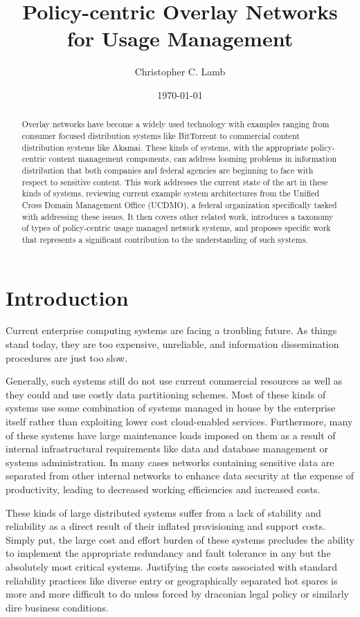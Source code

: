 \documentclass[12pt,letterpaper]{article}
\author{Christopher C. Lamb}
\title{Policy-centric Overlay Networks for Usage Management}
\date{\today}
\begin{document}
\maketitle

\doublespacing

\begin{abstract}
Overlay networks have become a widely used technology with examples ranging from consumer focused distribution systems like BitTorrent to commercial content distribution systems like Akamai.  These kinds of systems, with the appropriate policy-centric content management components, can address looming problems in information distribution that both companies and federal agencies are beginning to face with respect to sensitive content.  This work addresses the current state of the art in these kinds of systems, reviewing current example system architectures from the Unified Cross Domain Management Office (UCDMO), a federal organization specifically tasked with addressing these issues.  It then covers other related work, introduces a taxonomy of types of policy-centric usage managed network systems, and proposes specific work that represents a significant contribution to the understanding of such systems. 
\end{abstract}

\section{Introduction}
Current enterprise computing systems are facing a troubling future.  As things stand today, they are too expensive, unreliable, and information dissemination procedures are just too slow.

Generally, such systems still do not use current commercial resources as well as they could and use costly data partitioning schemes.  Most of these kinds of systems use some combination of systems managed in house by the enterprise itself rather than exploiting lower cost cloud-enabled services.  Furthermore, many of these systems have large maintenance loads imposed on them as a result of internal infrastructural requirements like data and database management or systems administration.  In many cases networks containing sensitive data are separated from other internal networks to enhance data security at the expense of productivity, leading to decreased working efficiencies and increased costs.

These kinds of large distributed systems suffer from a lack of stability and reliability as a direct result of their inflated provisioning and support costs.  Simply put, the large cost and effort burden of these systems precludes the ability to implement the appropriate redundancy and fault tolerance in any but the absolutely most critical systems.  Justifying the costs associated with standard reliability practices like diverse entry or geographically separated hot spares is more and more difficult to do unless forced by draconian legal policy or similarly dire business conditions.
\end{document}
